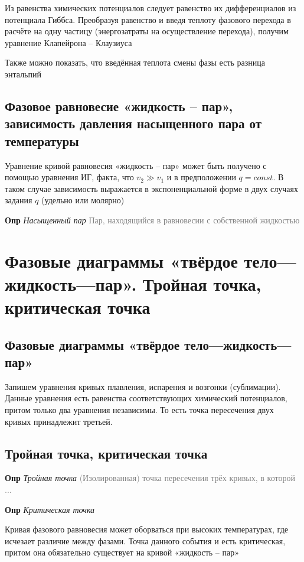 \documentclass[a4paper, 14pt]{article}
\begin{document}
    Из равенства химических потенциалов следует равенство их дифференциалов из потенциала Гиббса.
    Преобразуя равенство и введя теплоту фазового перехода в расчёте на одну частицу (энергозатраты на осуществление
    перехода), получим уравнение Клапейрона -- Клаузиуса

    Также можно показать, что введённая теплота смены фазы есть разница энтальпий

    \subsection{Фазовое равновесие «жидкость -- пар», зависимость давления насыщенного пара от температуры}

    Уравнение кривой равновесия «жидкость -- пар» может быть получено с помощью уравнения ИГ, факта, что $v_2 \gg
    v_1$ и в предположении $q = const$.
    В таком случае зависимость выражается в экспоненциальной форме в двух случаях задания $q$ (удельно или молярно)

    \textbf{Опр} \textit{Насыщенный пар} \textcolor{gray}{Пар, находящийся в равновесии с собственной жидкостью}

    \section{Фазовые диаграммы «твёрдое тело—жидкость—пар».
    Тройная точка, критическая точка}

    \subsection{Фазовые диаграммы «твёрдое тело—жидкость—пар»}

    Запишем уравнения кривых плавления, испарения и возгонки (сублимации).
    Данные уравнения есть равенства соответствующих химический потенциалов, притом только два уравнения независимы.
    То есть точка пересечения двух кривых принадлежит третьей.

    \subsection{Тройная точка, критическая точка}

    \textbf{Опр} \textit{Тройная точка} \textcolor{gray}{(Изолированная) точка пересечения трёх кривых, в которой ...}

    \textbf{Опр} \textit{Критическая точка}

    Кривая фазового равновесия может оборваться при высоких температурах, где исчезает различие между фазами.
    Точка данного события и есть критическая, притом она обязательно существует на кривой «жидкость -- пар»
\end{document}
